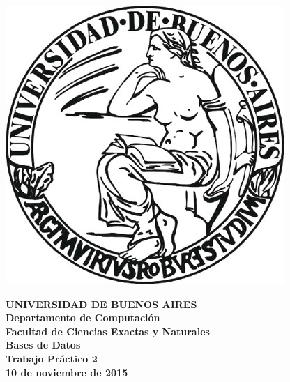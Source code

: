 \documentclass[11pt,a4paper]{article}
\begin{document}

\def\Materia{Bases de Datos}
\def\Titulo{Trabajo Pr\'{a}ctico 2}
\def\Fecha{10 de noviembre de 2015}


\thispagestyle{empty}

\begin{center}
	\includegraphics[scale = 0.25]{imagenes/logo_uba.jpg}
\end{center}

\begin{center}
	{\textbf{\large UNIVERSIDAD DE BUENOS AIRES}}\\[1.5em]
	{\textbf{\large Departamento de Computaci\'{o}n}}\\[1.5em]
    {\textbf{\large Facultad de Ciencias Exactas y Naturales}}\\
    \vspace{35mm}
    {\LARGE\textbf{\Materia}}\\[1em]    
    \vspace{15mm}
    {\Large \textbf{\Titulo}}\\[1em]
    \vspace{15mm}
    {\textbf{\Large \Fecha}}\\
    \vspace{15mm}
    \textbf{\tablaints}
\end{center}

\newpage
\thispagestyle{empty}
\tableofcontents

\parskip=5pt
\setlength{\parindent}{0pt}

\newpage
\setcounter{page}{1}
\pagestyle{plain}







\end{document}
